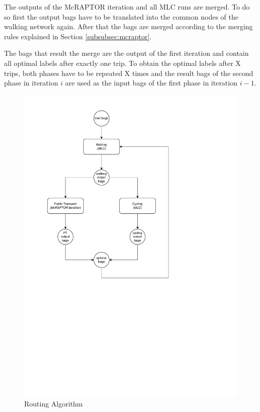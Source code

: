The outputs of the McRAPTOR iteration and all MLC runs are merged.
To do so first the output bags have to be translated into the common nodes of the walking network again.
After that the bags are merged according to the merging rules explained in Section \ref{subsubsec:mcraptor}.

The bags that result the merge are the output of the first iteration and contain all optimal labels after exactly one trip.
To obtain the optimal labels after X trips, both phases have to be repeated X times and the result bags of the second phase in iteration \(i\) are used as the input bags of the first phase in iteration \(i-1\).


\begin{figure}
    \centering
    \includegraphics[scale=0.75]{Figures/method/routing_algorithm}
    \caption{Routing Algorithm}
    \label{fig:routing_algorithm}
\end{figure}


